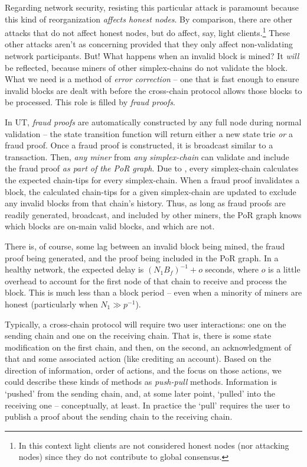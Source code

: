 Regarding network security, resisting this particular attack is paramount because this kind of reorganization \emph{affects honest nodes}.
By comparison, there are other attacks that do not affect honest nodes, but do affect, say, light clients.\footnote{
    In this context light clients are not considered honest nodes (nor attacking nodes) since they do not contribute to global consensus.
}
These other attacks aren't as concerning provided that they only affect non-validating network participants.
But! What happens when an invalid block is mined?
It \emph{will} be reflected, because miners of other simplex-chains do not validate the block.
What we need is a method of \emph{error correction} -- one that is fast enough to ensure invalid blocks are dealt with before the cross-chain protocol allows those blocks to be processed.
This role is filled by \emph{fraud proofs}.

In UT, \emph{fraud proofs} are automatically constructed by any full node during normal validation -- the state transition function will return either a new state trie \emph{or} a fraud proof.
Once a fraud proof is constructed, it is broadcast similar to a transaction.
Then, \emph{any miner} from \emph{any simplex-chain} can validate and include the fraud proof \emph{as part of the PoR graph}.
Due to \AxOfUnifiedAncestry{}, every simplex-chain calculates the expected chain-tips for every simplex-chain.
When a fraud proof invalidates a block, the calculated chain-tips for a given simplex-chain are updated to exclude any invalid blocks from that chain's history.
Thus, as long as fraud proofs are readily generated, broadcast, and included by other miners, the PoR graph knows which blocks are on-main valid blocks, and which are not.

There is, of course, some lag between an invalid block being mined, the fraud proof being generated, and the proof being included in the PoR graph.
In a healthy network, the expected delay is $(N_1 B_f)^{-1} + o$ seconds, where $o$ is a little overhead to account for the first node of that chain to receive and process the block.
This is much less than a block period -- even when a minority of miners are honest (particularly when $N_1 \gg p^{-1}$).


Typically, a cross-chain protocol will require two user interactions: one on the sending chain and one on the receiving chain.
That is, there is some state modification on the first chain, and then, on the second, an acknowledgment of that and some associated action (like crediting an account).
Based on the direction of information, order of actions, and the focus on those actions, we could describe these kinds of methods as \emph{push-pull} methods.
Information is `pushed' from the sending chain, and, at some later point, `pulled' into the receiving one -- conceptually, at least.
In practice the `pull' requires the user to publish a proof about the sending chain to the receiving chain.

